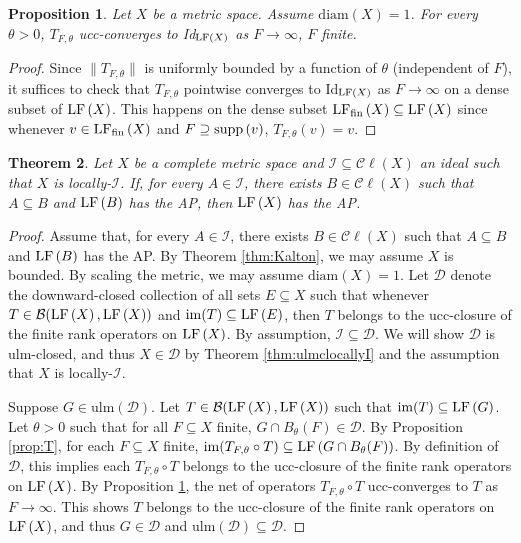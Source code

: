 \documentclass[12pt]{amsart}
\newtheorem{theorem}{Theorem}[section]
\newtheorem{prop}[theorem]{Proposition}
\theoremstyle{definition}
\numberwithin{equation}{section}
\def \D {\mathcal{D}}
\def \B {\mathcal{B}}
\def \I {\mathcal{I}}
\def \comp {\circ}
\def \sbs {\subseteq}
\def \sps {\supseteq}
\def \im {\mathrm{im}}
\newcommand{\Cl}[1]{\mathcal{C}\ell\left(#1\right)}
\newcommand{\diam}[1]{\mathrm{diam}\left( #1 \right)}
\newcommand{\ulm}[1]{\mathrm{ulm}\left(#1\right)}
\begin{document}
\begin{prop} \label{prop:Tconv}
Let $X$ be a metric space. Assume $\diam{X} = 1$. For every $\theta > 0$, $T_{F,\theta}$ ucc-converges to Id$_{\LF{X}}$ as $F \to \infty$, $F$ finite.
\end{prop}

\begin{proof}
Since $\|T_{F,\theta}\|$ is uniformly bounded by a function of $\theta$ (independent of $F$), it suffices to check that $T_{F,\theta}$ pointwise converges to Id$_{\LF{X}}$ as $F \to \infty$ on a dense subset of $\LF{X}$. This happens on the dense subset $\LFf{X} \sbs \LF{X}$ since whenever $v \in \LFf{X}$ and $F \sps \supp{v}$, $T_{F,\theta}(v) = v$.
\end{proof}

\begin{theorem} \label{thm:AP}
Let $X$ be a complete metric space and $\I \sbs \Cl{X}$ an ideal such that $X$ is locally-$\I$. If, for every $A \in \I$, there exists $B \in \Cl{X}$ such that $A \sbs B$ and $\LF{B}$ has the AP, then $\LF{X}$ has the AP.
\end{theorem}

\begin{proof}
Assume that, for every $A \in \I$, there exists $B \in \Cl{X}$ such that $A \sbs B$ and $\LF{B}$ has the AP. By Theorem \ref{thm:Kalton}, we may assume $X$ is bounded. By scaling the metric, we may assume $\diam{X} = 1$. Let $\D$ denote the downward-closed collection of all sets $E \sbs X$ such that whenever $T \in \B(\LF{X},\LF{X})$ and $\im(T) \sbs \LF{E}$, then $T$ belongs to the ucc-closure of the finite rank operators on $\LF{X}$. By assumption, $\I \sbs \D$. We will show $\D$ is ulm-closed, and thus $X \in \D$ by Theorem \ref{thm:ulmclocallyI} and the assumption that $X$ is locally-$\I$.

Suppose $G \in \ulm{\D}$. Let $T \in \B(\LF{X},\LF{X})$ such that $\im(T) \sbs \LF{G}$. Let $\theta > 0$ such that for all $F \sbs X$ finite, $G \cap B_\theta(F) \in \D$. By Proposition \ref{prop:T}, for each $F \sbs X$ finite, $\im(T_{F,\theta} \comp T) \sbs \LF{G \cap B_\theta(F)}$. By definition of $\D$, this implies each $T_{F,\theta} \comp T$ belongs to the ucc-closure of the finite rank operators on $\LF{X}$. By Proposition \ref{prop:Tconv}, the net of operators $T_{F,\theta} \comp T$ ucc-converges to $T$ as $F \to \infty$. This shows $T$ belongs to the ucc-closure of the finite rank operators on $\LF{X}$, and thus $G \in \D$ and $\ulm{\D} \sbs \D$.
\end{proof}
\end{document}
